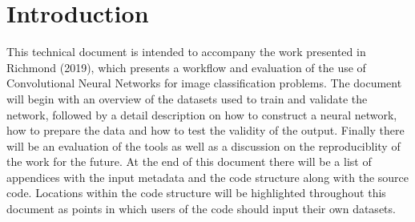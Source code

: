 \chapter{Introduction}
This technical document is intended to accompany the work presented in Richmond (2019), which presents a workflow and evaluation of the use of Convolutional Neural Networks for image classification problems. The document will begin with an overview of the datasets used to train and validate the network, followed by a detail description on how to construct a neural network, how to prepare the data and how to test the validity of the output. Finally there will be an evaluation of the tools as well as a discussion on the reproduciblity of the work for the future.
\newline
At the end of this document there will be a list of appendices with the input metadata and the code structure along with the source code. Locations within the code structure will be highlighted throughout this document as points in which users of the code should input their own datasets. 

